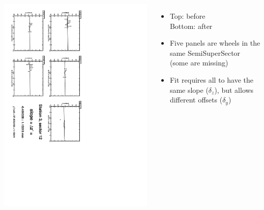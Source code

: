 \documentclass[compress]{beamer}
\begin{document}
\begin{frame}
\begin{columns}
\vfill
\includegraphics[height=\linewidth, angle=90]{zfits_after/zfit_3_12.pdf}
\begin{itemize}
\item Top: before \\ Bottom: after
\item Five panels are wheels in the same SemiSuperSector (some are missing)
\item Fit requires all to have the same slope ($\delta_z$), but allows different offsets ($\delta_y$)
\end{itemize}
\end{columns}
\end{frame}
\end{document}
